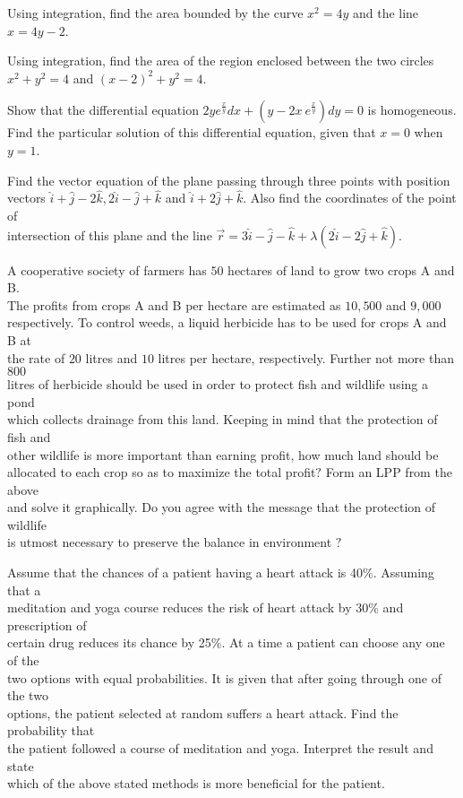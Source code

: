 \documentclass[14pt]{exam}
\begin{document}
\begin{questions}
	\question Using integration, find the area bounded by the curve $x^2=4y$ and the line $x=4y-2$.

	\question Using integration, find the area of the region enclosed between the two circles\\ $x^{2}+y^{2}=4$ and $(x-2)^{2}+y^{2}=4$.

	\question Show that the differential equation $2ye^{\frac{x}{y}}dx+(y-2x~e^{\frac{x}{y}})dy=0$ is homogeneous. Find the particular solution of this differential equation, given that $x=0$ when $y=1$.

	\question Find the vector equation of the plane passing through three points with position\\ vectors $\hat{i}+\hat{j}-2\hat{k},2\hat{i}-\hat{j}+\hat{k}$ and $\hat{i}+2\hat{j}+\hat{k}$. Also find the coordinates of the point of\\ intersection of this plane and the line $\vec{r}=3\hat{i}-\hat{j}-\hat{k}+\lambda(2\hat{i}-2\hat{j}+\hat{k})$.

	\question A cooperative society of farmers has $50$ hectares of land to grow two crops A and B.\\ The profits from crops A and B per hectare are estimated as $10,500$ and $9,000$\\ respectively. To control weeds, a liquid herbicide has to be used for crops A and B at\\ the rate of $20$ litres and $10$ litres per hectare, respectively. Further not more than $800$\\ litres of herbicide should be used in order to protect fish and wildlife using a pond\\ which collects drainage from this land. Keeping in mind that the protection of fish and\\ other wildlife is more important than earning profit, how much land should be\\ allocated to each crop so as to maximize the total profit$?$ Form an LPP from the above\\ and solve it graphically. Do you agree with the message that the protection of wildlife\\ is utmost necessary to preserve the balance in environment $?$

	\question Assume that the chances of a patient having a heart attack is 40$\%$. Assuming that a\\ meditation and yoga course reduces the risk of heart attack by 30$\%$ and prescription of\\ certain drug reduces its chance by 25$\%$. At a time a patient can choose any one of the\\ two options with equal probabilities. It is given that after going through one of the two\\ options, the patient selected at random suffers a heart attack. Find the probability that\\ the patient followed a course of meditation and yoga. Interpret the result and state\\ which of the above stated methods is more beneficial for the patient.

\end{questions}
\end{document}
